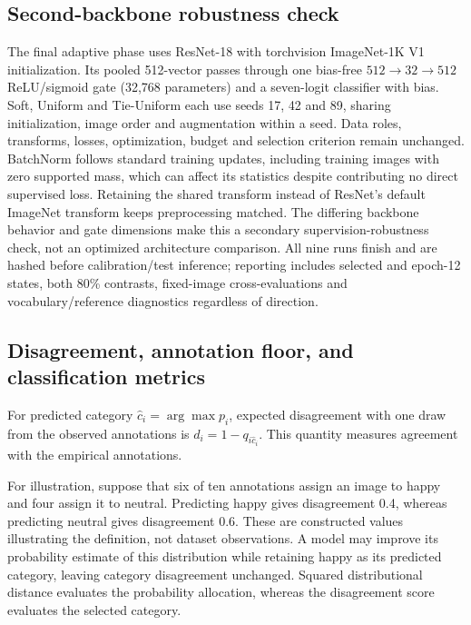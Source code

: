 \documentclass[pdflatex,sn-mathphys-num]{sn-jnl}
\begin{document}
\subsection{Second-backbone robustness check}
The final adaptive phase uses ResNet-18 \cite{he2016resnet} with torchvision ImageNet-1K V1 initialization. Its pooled 512-vector passes through one bias-free $512\!\to\!32\!\to\!512$ ReLU/sigmoid gate (32,768 parameters) and a seven-logit classifier with bias. Soft, Uniform and Tie-Uniform each use seeds 17, 42 and 89, sharing initialization, image order and augmentation within a seed. Data roles, transforms, losses, optimization, budget and selection criterion remain unchanged. BatchNorm follows standard training updates, including training images with zero supported mass, which can affect its statistics despite contributing no direct supervised loss. Retaining the shared transform instead of ResNet's default ImageNet transform keeps preprocessing matched. The differing backbone behavior and gate dimensions make this a secondary supervision-robustness check, not an optimized architecture comparison. All nine runs finish and are hashed before calibration/test inference; reporting includes selected and epoch-12 states, both 80\% contrasts, fixed-image cross-evaluations and vocabulary/reference diagnostics regardless of direction.

\subsection{Disagreement, annotation floor, and classification metrics}
For predicted category $\hat c_i=\arg\max p_i$, expected disagreement with one draw from the observed annotations is $d_i=1-q_{i\hat c_i}$. This quantity measures agreement with the empirical annotations.

For illustration, suppose that six of ten annotations assign an image to happy and four assign it to neutral. Predicting happy gives disagreement 0.4, whereas predicting neutral gives disagreement 0.6. These are constructed values illustrating the definition, not dataset observations. A model may improve its probability estimate of this distribution while retaining happy as its predicted category, leaving category disagreement unchanged. Squared distributional distance evaluates the probability allocation, whereas the disagreement score evaluates the selected category.
\end{document}
